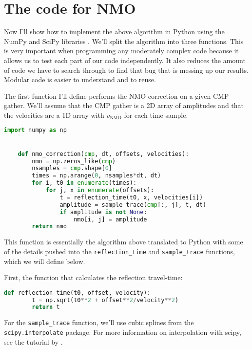 \section{The code for NMO}

Now I'll show how to implement the above algorithm in Python using the NumPy and SciPy libraries \citep{van_der_Walt_2011}.
We'll split the algorithm into three functions.
This is very important when programming any moderately complex code because it allows us to test each part of our code independently.
It also reduces the amount of code we have to search through to find that bug that is messing up our results.
Modular code is easier to understand and to reuse.

The first function I'll define performs the NMO correction on a given CMP gather.
We'll assume that the CMP gather is a 2D array of amplitudes and that the
velocities are a 1D array with $v_\mathrm{NMO}$ for each time sample.

\begin{lstlisting}[language=python]
    import numpy as np


    def nmo_correction(cmp, dt, offsets, velocities):
        nmo = np.zeros_like(cmp)
        nsamples = cmp.shape[0]
        times = np.arange(0, nsamples*dt, dt)
        for i, t0 in enumerate(times):
            for j, x in enumerate(offsets):
                t = reflection_time(t0, x, velocities[i])
                amplitude = sample_trace(cmp[:, j], t, dt)
                if amplitude is not None:
                    nmo[i, j] = amplitude
        return nmo
\end{lstlisting}

This function is essentially the algorithm above translated to Python with some
of the details pushed into the \texttt{reflection\_time} and
\texttt{sample\_trace} functions, which we will define below.

First, the function that calculates the reflection travel-time:

\begin{lstlisting}[language=python]
    def reflection_time(t0, offset, velocity):
        t = np.sqrt(t0**2 + offset**2/velocity**2)
        return t
\end{lstlisting}

For the \texttt{sample\_trace} function, we'll use cubic splines from the
\texttt{scipy.interpolate} package.
For more information on interpolation with scipy, see the tutorial by
\citet{Hall_2016}.

